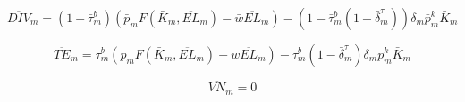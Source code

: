 \documentclass[letterpaper,12pt]{article}
\theoremstyle{definition}
\begin{document}
\begin{spacing}{1.5}
\begin{equation}
\overline{DIV}_{m} = (1-\bar{\tau}^{b}_{m})\left(\bar{p}_{m}F(\bar{K}_{m},\overline{EL}_{m}) - \bar{w}\overline{EL}_{m}\right) - (1-\bar{\tau}^{b}_{m}(1-\bar{\delta}^{\tau}_{m}))\delta_{m}\bar{p}^{k}_{m}\bar{K}_{m} 
\end{equation}

\begin{equation}
\label{eqn:inc_tax_firm_ss}
\overline{TE}_{m} =\bar{\tau}^{b}_{m}\left(\bar{p}_{m}F(\bar{K}_{m},\overline{EL}_{m})-\bar{w}\overline{EL}_{m} \right) - \bar{\tau}^{b}_{m}(1-\bar{\delta}^{\tau}_{m})\delta_{m}\bar{p}^{k}_{m}\bar{K}_{m} 
\end{equation}

\begin{equation}
\overline{VN}_{m} = 0
\end{equation}
%
%
%
%
%

\end{spacing}
\end{document}
